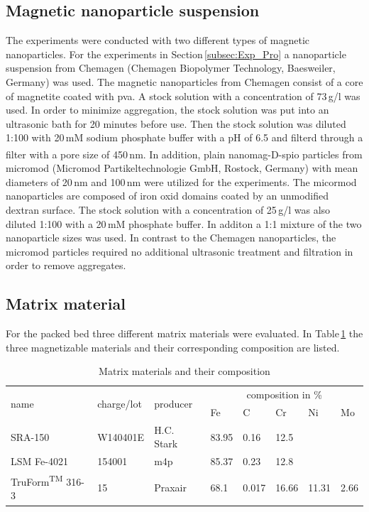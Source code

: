 \subsection{Magnetic nanoparticle suspension}
\label{subsec:Mag_nanoparticles}
The experiments were conducted with two different types of magnetic nanoparticles. For the experiments in Section\,\ref{subsec:Exp_Pro} a nanoparticle suspension from Chemagen (Chemagen Biopolymer Technology, Baesweiler, Germany) was used. The magnetic nanoparticles from Chemagen consist of a core of magnetite coated with \gls{pva}. A stock solution with a concentration of 73\,g/l was used. In order to minimize aggregation, the stock solution was put into an ultrasonic bath for 20 minutes before use. Then the stock solution was diluted 1:100 with 20\,mM sodium phosphate buffer with a pH of 6.5 and filterd through a filter with a pore size of 450\,nm. 
In addition,  plain nanomag\textsuperscript{\textregistered}-D-spio particles from micromod (Micromod Partikeltechnologie GmbH, Rostock, Germany) with mean diameters of 20\,nm and 100\,nm were utilized for the experiments. The micormod nanoparticles are composed of iron oxid domains coated by an unmodified dextran surface. The stock solution with a concentration of 25\,g/l was also diluted 1:100 with a 20\,mM phosphate buffer. In additon a 1:1 mixture of the two nanoparticle sizes was used. In contrast to the Chemagen nanoparticles, the micromod particles required no additional ultrasonic treatment and filtration in order to remove aggregates.     

\subsection{Matrix material}
\label{subsec:Matrix_mat}
For the packed bed three different matrix materials were evaluated. In Table\,\ref{table:mat_material} the three magnetizable materials and their corresponding composition are listed.    

\begin{table}[H]
\centering
\caption{Matrix materials and their composition}
\label{table:mat_material}
\begin{tabularx}{\textwidth}{XXXXXXXX}\hline
\multirow{2}{*}{name} & \multirow{2}{*}{charge/lot} & \multirow{2}{*}{producer} & \multicolumn{5}{c}{composition in \%}  \\
& & & Fe & C & Cr & Ni & Mo \\
\hline\hline
SRA-150 & W140401E & H.C. Stark & 83.95 & 0.16 & 12.5  & & \\
LSM Fe-4021 & 154001 & m4p & 85.37 & 0.23 & 12.8 & & \\
TruForm\textsuperscript{TM} 316-3 & 15 & Praxair & 68.1 & 0.017 & 16.66 &11.31& 2.66\\
\hline
\end{tabularx}
\end{table}


